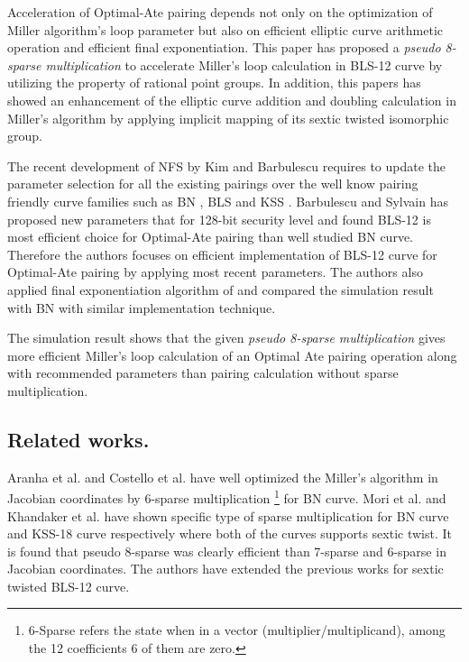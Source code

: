 Acceleration of Optimal-Ate pairing depends not only on the optimization of Miller algorithm's loop parameter but also on efficient elliptic curve arithmetic operation and efficient final exponentiation.  
This paper has proposed a \textit{pseudo 8-sparse multiplication} to accelerate Miller's loop calculation in BLS-12 curve by utilizing the property of  rational point groups.
In addition, this papers has showed an enhancement of the elliptic curve addition and doubling calculation in Miller's algorithm by applying implicit mapping of its sextic twisted isomorphic group. 

The recent development of NFS by Kim and Barbulescu \cite{kim_ecdlp} requires to update the parameter selection for all the existing pairings over the well know pairing friendly curve families such as BN \cite{BN}, BLS \cite{bls} and KSS \cite{kss}.
Barbulescu and Sylvain \cite{sylvain_new_param} has proposed new parameters that for 128-bit security level and found BLS-12 is most efficient choice for Optimal-Ate pairing than well studied BN curve. Therefore the authors focuses on efficient implementation of BLS-12 curve for Optimal-Ate pairing by applying most recent parameters. 
The authors also applied final exponentiation algorithm of \cite{loubna_bls12} and compared the simulation result with BN with similar implementation technique.

The simulation result shows that the given \textit{pseudo 8-sparse multiplication} gives more efficient Miller's loop calculation of an Optimal Ate pairing operation along with recommended parameters than pairing calculation without sparse multiplication.

\subsection*{Related works.}
Aranha et al. \cite[Section 4]{aranha2011faster} and Costello et al. \cite{costello2010faster} have  well optimized the Miller's algorithm in Jacobian coordinates by 6-sparse multiplication \footnote{\label{6sparse}{6-Sparse refers the state when in a vector (multiplier/multiplicand), among the 12 coefficients 6 of them are zero.}} for BN curve. 
Mori et al. \cite{mori} and Khandaker et al. \cite{self_ICISC} have shown  specific type of sparse multiplication for BN curve and KSS-18 curve respectively where both of the curves supports sextic twist.
It is found that pseudo 8-sparse was clearly efficient than 7-sparse and 6-sparse in Jacobian coordinates.
The authors have extended the previous works for sextic twisted BLS-12 curve.


